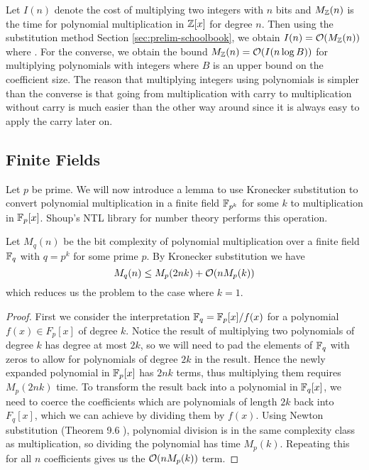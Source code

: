 Let $I(n)$ denote the cost of multiplying two integers with $n$ bits and $M_{\mathbb Z}(n)$ is the time for polynomial multiplication in ${\mathbb Z}[x]$ for degree $n$. Then using the substitution method Section \ref{sec:prelim-schoolbook}, we obtain $I(n) = \mathcal O(M_{\mathbb Z}(n))$ where . For the converse, we obtain the bound $M_{\mathbb Z}(n) = \mathcal O(I(n\log B))$ for multiplying polynomials with integers where $B$ is an upper bound on the coefficient size. The reason that multiplying integers using polynomials is simpler than the converse is that going from multiplication with carry to multiplication without carry is much easier than the other way around since it is always easy to apply the carry later on.


\subsection{Finite Fields}%
\label{sub:Finite Field}

Let $p$ be prime. We will now introduce a lemma to use Kronecker substitution to convert polynomial multiplication in a finite field ${\mathbb F}_{p^k}$ for some $k$ to multiplication in ${\mathbb F}_p [x]$. Shoup's NTL library for number theory \cite{ntl} performs this operation.

\begin{lemma}
    Let $M_q(n)$ be the bit complexity of polynomial multiplication over a finite field ${\mathbb F}_q$ with $q = p^k$ for some prime $p$. By Kronecker substitution we have
    \[
        M_q(n) \leq M_p(2nk) + \mathcal O(n M_p(k))
    \]
    which reduces us the problem to the case where $k = 1$.
\end{lemma}

\begin{proof}
    First we consider the interpretation ${\mathbb F}_q = {\mathbb F}_p[x] / f(x)$ for a polynomial $f(x) \in F_p[x]$ of degree $k$. Notice the result of multiplying two polynomials of degree $k$ has degree at most $2k$, so we will need to pad the elements of ${\mathbb F}_q$ with zeros to allow for polynomials of degree $2k$ in the result. Hence the newly expanded polynomial in ${\mathbb F}_p[x]$ has $2nk$ terms, thus multiplying them requires $M_p(2nk)$ time. To transform the result back into a polynomial in ${\mathbb F}_q[x]$, we need to coerce the coefficients which are polynomials of length $2k$ back into $F_q[x]$, which we can achieve by dividing them by $f(x)$. Using Newton substitution (Theorem 9.6 \cite{modern-comp-alg}), polynomial division is in the same complexity class as multiplication, so dividing the polynomial has time $M_p(k)$. Repeating this for all $n$ coefficients gives us the $\mathcal O(n M_p(k))$ term.
\end{proof}

